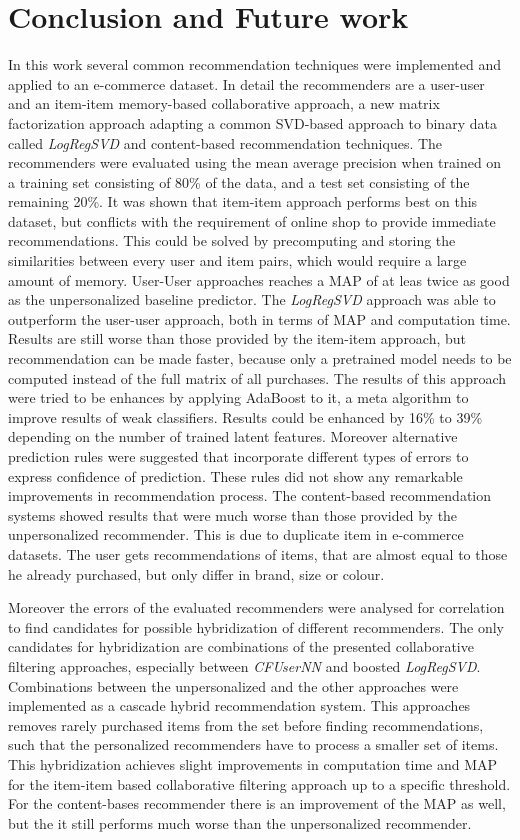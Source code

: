 \documentclass[10pt]{reportMaster}
\begin{document}
\chapter{Conclusion and Future work}
\label{chap:conclusionAndFutureWork}
In this work several common recommendation techniques were implemented and applied to an e-commerce dataset.
In detail the recommenders are a user-user and an item-item memory-based collaborative approach, a new matrix factorization approach adapting a common SVD-based approach to binary data called \textit{LogRegSVD} and content-based recommendation techniques.
The recommenders were evaluated using the mean average precision when trained on a training set consisting of 80\% of the data, and a test set consisting of the remaining 20\%.
It was shown that item-item approach performs best on this dataset, but conflicts with the requirement of online shop to provide immediate recommendations.
This could be solved by precomputing and storing the similarities between every user and item pairs, which would require a large amount of memory.
User-User approaches reaches a MAP of at leas twice as good as the unpersonalized baseline predictor.
The \textit{LogRegSVD} approach was able to outperform the user-user approach, both in terms of MAP and computation time.
Results are still worse than those provided by the item-item approach, but recommendation can be made faster, because only a pretrained model needs to be computed instead of the full matrix of all purchases.
The results of this approach were tried to be enhances by applying AdaBoost to it, a meta algorithm to improve results of weak classifiers.
Results could be enhanced by 16\% to 39\% depending on the number of trained latent features.
Moreover alternative prediction rules were suggested that incorporate different types of errors to express confidence of prediction.
These rules did not show any remarkable improvements in recommendation process.
The content-based recommendation systems showed results that were much worse than those provided by the unpersonalized recommender.
This is due to duplicate item in e-commerce datasets.
The user gets recommendations of items, that are almost equal to those he already purchased, but only differ in brand, size or colour.

Moreover the errors of the evaluated recommenders were analysed for correlation to find candidates for possible hybridization of different recommenders.
The only candidates for hybridization are combinations of the presented collaborative filtering approaches, especially between \textit{CFUserNN} and boosted \textit{LogRegSVD}.
Combinations between the unpersonalized and the other approaches were implemented as a cascade hybrid recommendation system.
This approaches removes rarely purchased items from the set before finding recommendations, such that the personalized recommenders have to process a smaller set of items.
This hybridization achieves slight improvements in computation time and MAP for the item-item based collaborative filtering approach up to a specific threshold.
For the content-bases recommender there is an improvement of the MAP as well, but the it still performs much worse than the unpersonalized recommender.
\end{document}
